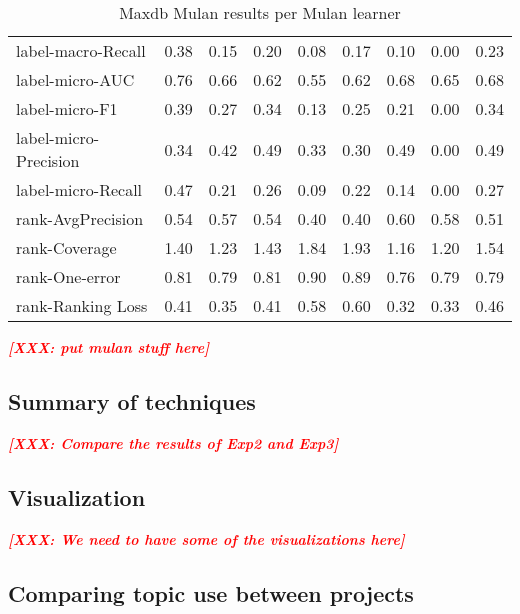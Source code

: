 \documentclass{acm_proc_article-sp}
\newcommand{\XXX}[1]{\textcolor{red}{{\it \textbf{[XXX: #1]}}}}
\begin{document}
\begin{table*}
\begin{tabular}{l|rrrrrrrr}
label-macro-Recall & 0.38 & 0.15 & 0.20 & 0.08 & 0.17 & 0.10 & 0.00 & 0.23 \\

label-micro-AUC & 0.76 & 0.66 & 0.62 & 0.55 & 0.62 & 0.68 & 0.65 & 0.68 \\

label-micro-F1 & 0.39 & 0.27 & 0.34 & 0.13 & 0.25 & 0.21 & 0.00 & 0.34 \\

label-micro-Precision & 0.34 & 0.42 & 0.49 & 0.33 & 0.30 & 0.49 & 0.00 & 0.49 \\

label-micro-Recall & 0.47 & 0.21 & 0.26 & 0.09 & 0.22 & 0.14 & 0.00 & 0.27 \\

rank-AvgPrecision & 0.54 & 0.57 & 0.54 & 0.40 & 0.40 & 0.60 & 0.58 & 0.51 \\

rank-Coverage & 1.40 & 1.23 & 1.43 & 1.84 & 1.93 & 1.16 & 1.20 & 1.54 \\

rank-One-error & 0.81 & 0.79 & 0.81 & 0.90 & 0.89 & 0.76 & 0.79 & 0.79 \\

rank-Ranking Loss & 0.41 & 0.35 & 0.41 & 0.58 & 0.60 & 0.32 & 0.33 & 0.46 \\

\end{tabular}

\caption{Maxdb Mulan results per Mulan learner}

\end{table*}
\XXX{put mulan stuff here}

\subsection{Summary of techniques}

\XXX{Compare the results of Exp2 and Exp3}


\subsection{Visualization}

\XXX{We need to have some of the visualizations here}

\subsection{Comparing topic use between projects}
\end{document}
